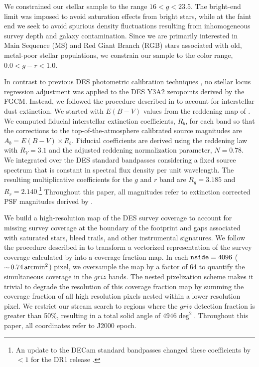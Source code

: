 \documentclass[twocolumn]{aastex61}
\begin{document}
We constrained our stellar sample to the range $16 < g < 23.5$. 
The bright-end limit was imposed to avoid saturation effects from bright stars, while at the faint end we seek  to avoid spurious density fluctuations resulting from inhomogeneous survey depth and galaxy contamination. 
Since we are primarily interested in Main Sequence (MS) and Red Giant Branch (RGB) stars associated with old, metal-poor stellar populations, we constrain our sample to the color range, $0.0 < g-r < 1.0$.

In contrast to previous DES photometric calibration techniques \citep{Drlica-Wagner:2015,Drlica-Wagner:2017}, no stellar locus regression adjustment was applied to the DES Y3A2 zeropoints derived by the FGCM.
Instead, we followed the procedure described in \citet{DES:2018} to account for interstellar dust extinction.
We started with $E(B-V)$ values from the reddening map of \citet[SFD;][]{Schlegel:1998}.
We computed fiducial interstellar extinction coefficients, $R_b$, for each band so that the corrections to the top-of-the-atmosphere calibrated source magnitudes are $A_b = E(B-V) \times R_b$.
Fiducial coefficients are derived using the \citet{Fitzpatrick:1999} reddening law with $R_V = 3.1$ and the \citet{Schlafly:2011} adjusted reddening normalization parameter, $N = 0.78$. 
We integrated over the DES standard bandpasses considering a fixed source spectrum that is constant in spectral flux density per unit wavelength.
The resulting multiplicative coefficients for the $g$ and $r$ band are $R_g = 3.185$ and $R_r = 2.140$.\footnote{An update to the DECam standard bandpasses changed these coefficients by $<1$ \mmag for the DR1 release \citep{DES:2018}.}
Throughout this paper, all magnitudes refer to extinction corrected PSF magnitudes derived by \ngmix.

We build a high-resolution map of the DES survey coverage to account for missing survey coverage at the boundary of the footprint and gaps associated with saturated stars, bleed trails, and other instrumental signatures.
We follow the procedure described in \citet{Drlica-Wagner:2017} to transform a vectorized representation of the survey coverage calculated by \mangle \citep{Hamilton:2004, Swanson:2008} into a \healpix \citep{Gorski:2005} coverage fraction map.
In each $\texttt{nside} = 4096$ ($ {\sim}\, 0.74 \mathrm{\,arcmin}^2$) \healpix pixel, we oversample the \mangle map by a factor of 64 to quantify the simultaneous coverage in the $griz$ bands.
The \healpix nested pixelization scheme makes it trivial to degrade the resolution of this coverage fraction map by summing the coverage fraction of all high resolution pixels nested within a lower resolution pixel.
We restrict our stream search to regions where the $griz$ detection fraction is greater than 50\%, resulting in a total solid angle of $4946 \deg^2$.
Throughout this paper, all coordinates refer to J2000 epoch.
\end{document}
